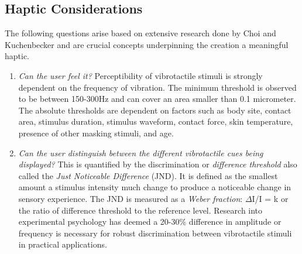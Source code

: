 \subsection{Haptic Considerations} \label{hapticConsiderations}
The following questions arise based on extensive research done by Choi and Kuchenbecker \cite{choi2013vibrotactile} and are crucial concepts underpinning the creation a meaningful haptic.
\begin{enumerate}
    \item \emph{Can the user feel it?}
Perceptibility of vibrotactile stimuli is strongly dependent on the frequency of vibration. The minimum threshold is observed to be between 150-300Hz and can cover an area smaller than 0.1 micrometer. The absolute thresholds are dependent on factors such as body site, contact area, stimulus duration, stimulus waveform, contact force, skin temperature, presence of other masking stimuli, and age.

    \item \emph{Can the user distinguish between the different vibrotactile cues being displayed?}
This is quantified by the discrimination or \textit{difference threshold} also called the \textit{Just Noticeable Difference} (JND). It is defined as the smallest amount a stimulus intensity much change to produce a noticeable change in sensory experience. The JND is measured as a \textit{Weber fraction}:
${\Delta}$I/I = k or the ratio of difference threshold to the reference level.
Research into experimental psychology has deemed a 20-30\% difference in amplitude or frequency is necessary for robust discrimination between vibrotactile stimuli in practical applications.


\end{enumerate}
